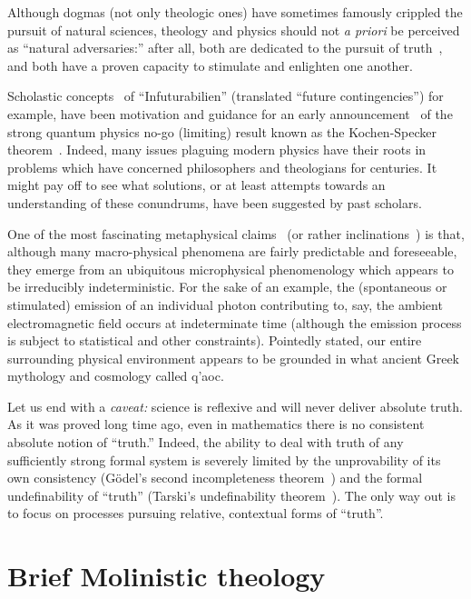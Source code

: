 \documentclass[%
  twocolumn,
 showpacs,
 showkeys,
 preprintnumbers,
 amsmath,amssymb,
 aps,
  pra,
  longbibliography,
 ]{revtex4-1}
\begin{document}
Although  dogmas  (not only theologic ones)  have sometimes famously crippled the pursuit of natural sciences,
theology and physics should not {\it a priori} be perceived as ``natural adversaries:'' after all, both are dedicated to the
pursuit of truth~\cite{Sagan-Contact},
and both have a proven capacity to stimulate and enlighten one another.

Scholastic concepts~\cite{Solana-Historia}
of ``Infuturabilien'' (translated ``future contingencies'') for example, have been motivation and guidance for an early
announcement~\cite{specker-60} of the strong quantum physics no-go (limiting) result known as
the Kochen-Specker theorem~\cite{kochen1}.
Indeed, many issues plaguing modern physics have their roots in problems which have concerned philosophers and theologians for centuries.
It might %
pay off to see what solutions, or at least attempts towards an understanding of these conundrums, have been suggested by past scholars.



One of the most fascinating metaphysical claims~\cite{zeil-05_nature_ofQuantum,Bradley-2016} (or rather inclinations~\cite{born-26-1}) is that,
although many macro-physical %
phenomena are fairly predictable and foreseeable,
they emerge from an ubiquitous microphysical phenomenology  which  appears to be irreducibly indeterministic.
For the sake of an example, the (spontaneous or stimulated) emission of an individual photon contributing to, say,
the ambient electromagnetic field occurs at indeterminate time (although the emission process is subject to statistical and other constraints).
Pointedly stated, our entire surrounding physical environment
appears to be grounded in what ancient Greek mythology and cosmology called \textgreek{q'aoc}.


Let us end with a {\it caveat:} science is reflexive and will never deliver absolute truth.
As it was proved long time ago, even in mathematics there is no consistent absolute notion of ``truth.''  Indeed,
the ability to deal with truth of
any sufficiently  strong formal system is severely limited by  the
 unprovability of its own
consistency (G\"odel's second incompleteness theorem~\cite{godel1})
and    the formal undefinability of ``truth'' (Tarski's undefinability theorem~\cite{tarski:36}).
The only way out is to  focus on processes pursuing relative, contextual forms of ``truth''.


\section{Brief Molinistic theology}
\end{document}
